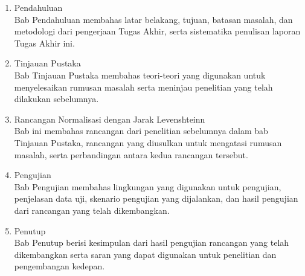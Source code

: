 \begin{enumerate}[label=Bab \arabic*,itemindent=*]
	\item Pendahuluan\\
	Bab Pendahuluan membahas latar belakang, tujuan, batasan masalah, dan metodologi dari pengerjaan Tugas Akhir, serta sistematika penulisan laporan Tugas Akhir ini.
	\item Tinjauan Pustaka\\
	Bab Tinjauan Pustaka membahas teori-teori yang digunakan untuk menyelesaikan rumusan masalah serta meninjau penelitian yang telah dilakukan sebelumnya.
	\item Rancangan Normalisasi dengan Jarak Levenshteinn\\
	Bab ini membahas rancangan dari penelitian sebelumnya dalam bab Tinjauan Pustaka, rancangan yang diusulkan untuk mengatasi rumusan masalah, serta perbandingan antara kedua rancangan tersebut.
	\item Pengujian\\
	Bab Pengujian membahas lingkungan yang digunakan untuk pengujian, penjelasan data uji, skenario pengujian yang dijalankan, dan hasil pengujian dari rancangan yang telah dikembangkan.
	\item Penutup\\
	Bab Penutup berisi kesimpulan dari hasil pengujian rancangan yang telah dikembangkan serta saran yang dapat digunakan untuk penelitian dan pengembangan kedepan.
\end{enumerate}
